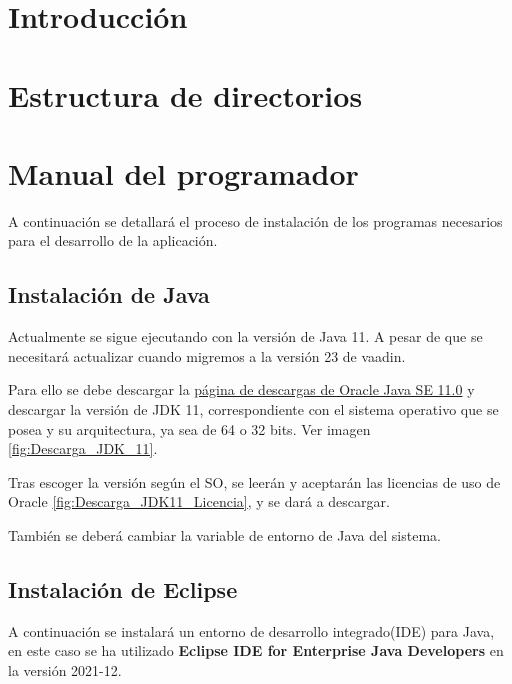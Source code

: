 
\section{Introducción}

\section{Estructura de directorios}

\section{Manual del programador}

A continuación se detallará el proceso de instalación de los programas
necesarios para el desarrollo de la aplicación.

\subsection{Instalación de Java}

Actualmente se sigue ejecutando con la versión de Java 11. A pesar de que se necesitará actualizar cuando migremos a la versión 23 de vaadin.

Para ello se debe descargar la \href{https://www.oracle.com/es/java/technologies/javase/jdk11-archive-downloads.html}{página de descargas de Oracle Java SE 11.0} y descargar la versión de JDK 11, correspondiente con el sistema operativo que se posea y su arquitectura, ya sea de 64 o 32 bits. Ver imagen \ref{fig:Descarga_JDK_11}.

Tras escoger la versión según el SO, se leerán y aceptarán las licencias de uso de Oracle \ref{fig:Descarga_JDK11_Licencia}, y se dará a descargar.


También se deberá cambiar la variable de entorno de Java del sistema.



\subsection{Instalación de Eclipse}
A continuación se instalará un entorno de desarrollo integrado(IDE) para Java, en este caso se ha utilizado \textbf{Eclipse IDE for Enterprise Java Developers} en la versión 2021-12. 

